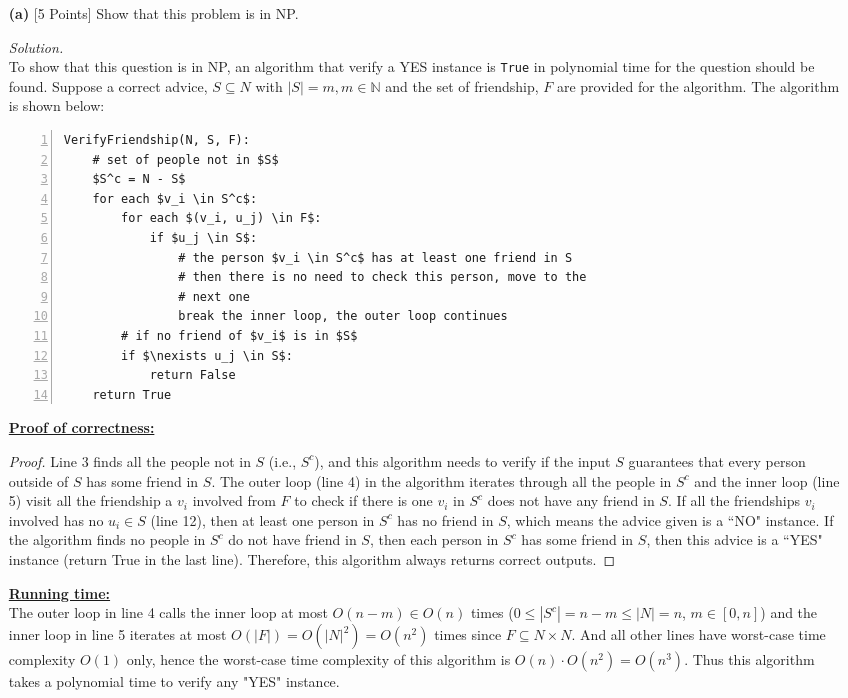 \documentclass[10pt]{article}
\begin{document}
\begin{itemize}
    \item [\textbf{(a)}] {[5 Points]} Show that this problem is in NP.
    \begin{mdframed}
        \textit{Solution.}\\
        To show that this question is in NP, an algorithm that verify a YES instance is \texttt{True} in polynomial time for the question should be found. Suppose a correct advice, $S \subseteq N$ with $|S| = m, m \in \mathbb{N}$ and the set of friendship, $F$ are provided for the algorithm. The algorithm is shown below:
        \begin{lstlisting}[mathescape=true, numbers=left]
VerifyFriendship(N, S, F):
    # set of people not in $S$
    $S^c = N - S$
    for each $v_i \in S^c$:
        for each $(v_i, u_j) \in F$:
            if $u_j \in S$:
                # the person $v_i \in S^c$ has at least one friend in S
                # then there is no need to check this person, move to the
                # next one
                break the inner loop, the outer loop continues
        # if no friend of $v_i$ is in $S$
        if $\nexists u_j \in S$:
            return False
    return True 
        \end{lstlisting}
        
    \underline{\textbf{Proof of correctness:}}
    \begin{proof}
    Line 3 finds all the people not in $S$ (i.e., $S^c$), and this algorithm needs to verify if the input $S$ guarantees that every person outside of $S$ has some friend in $S$. The outer loop (line 4) in the algorithm iterates through all the people in $S^c$ and the inner loop (line 5) visit all the friendship a $v_i$ involved from $F$ to check if there is one $v_i$ in $S^c$ does not have any friend in $S$. If all the friendships $v_i$ involved has no $u_i \in S$ (line 12), then at least one person in $S^c$ has no friend in $S$, which means the advice given is a ``NO" instance. If the algorithm finds no people in $S^c$ do not have friend in $S$, then each person in $S^c$ has some friend in $S$, then this advice is a ``YES" instance (return True in the last line). Therefore, this algorithm always returns correct outputs.
    \end{proof}
    \underline{\textbf{Running time:}}\\
    The outer loop in line 4 calls the inner loop at most $O(n - m) \in O(n)$ times ($0 \leq |S^c| = n - m \leq |N| = n$, $m \in [0, n]$) and the inner loop in line 5 iterates at most $O(|F|) = O(|N|^2) = O(n^2)$ times since $F \subseteq N \times N$. And all other lines have worst-case time complexity $O(1)$ only, hence the worst-case time complexity of this algorithm is $O(n) \cdot O(n^2) = O(n^3)$. Thus this algorithm takes a polynomial time to verify any "YES" instance.
    \end{mdframed}
    

\end{itemize}
\end{document}
